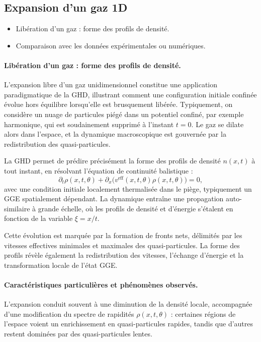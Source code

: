 \subsection{Expansion d’un gaz 1D}
{\color{blue}
\begin{itemize}
    \item Libération d’un gaz : forme des profils de densité.
    \item Comparaison avec les données expérimentales ou numériques.
\end{itemize}
}

\paragraph{Libération d’un gaz : forme des profils de densité.}
L’expansion libre d’un gaz unidimensionnel constitue une application paradigmatique de la GHD, illustrant comment une configuration initiale confinée évolue hors équilibre lorsqu’elle est brusquement libérée. Typiquement, on considère un nuage de particules piégé dans un potentiel confiné, par exemple harmonique, qui est soudainement supprimé à l’instant $t=0$. Le gaz se dilate alors dans l’espace, et la dynamique macroscopique est gouvernée par la redistribution des quasi-particules.

La GHD permet de prédire précisément la forme des profils de densité $n(x,t)$ à tout instant, en résolvant l’équation de continuité balistique :
\[
\partial_t \rho(x,t,\theta) + \partial_x \bigl( v^{\mathrm{eff}}(x,t,\theta) \rho(x,t,\theta) \bigr) = 0,
\]
avec une condition initiale localement thermalisée dans le piège, typiquement un GGE spatialement dépendant. La dynamique entraîne une propagation auto-similaire à grande échelle, où les profils de densité et d’énergie s’étalent en fonction de la variable $\xi = x/t$.

Cette évolution est marquée par la formation de fronts nets, délimités par les vitesses effectives minimales et maximales des quasi-particules. La forme des profils révèle également la redistribution des vitesses, l’échange d’énergie et la transformation locale de l’état GGE.

\paragraph{Caractéristiques particulières et phénomènes observés.}
L’expansion conduit souvent à une diminution de la densité locale, accompagnée d’une modification du spectre de rapidités $\rho(x,t,\theta)$ : certaines régions de l’espace voient un enrichissement en quasi-particules rapides, tandis que d’autres restent dominées par des quasi-particules lentes.

